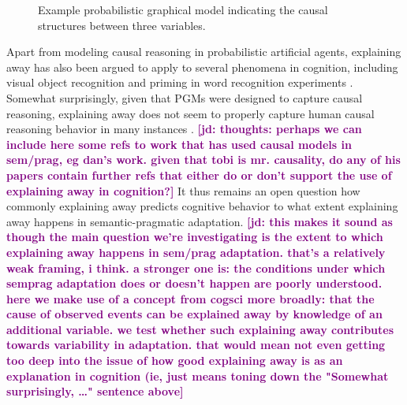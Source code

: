 \documentclass[man,floatsintext]{apa6}
\newcommand{\jd}[1]{\textcolor{Purple}{\bf [jd: #1]}}
\begin{document}
\begin{figure}[t]
    \centering
    \caption{Example probabilistic graphical model indicating the causal structures between three variables.}
    \label{fig:pgm-ex}
\end{figure}

Apart from modeling causal reasoning in probabilistic artificial agents, explaining away has also been argued to apply to several phenomena in cognition, including visual object recognition \cite{Murray2002} and priming in word recognition experiments \cite{Huber2008}. Somewhat surprisingly, given that PGMs were designed to capture causal reasoning, explaining away does not seem to properly capture human causal reasoning behavior in many instances \cite[inter alia]{Morris1995,Tenenbaum2002,Rehder2017}.  \jd{thoughts: perhaps we can include here some refs to work that has used causal models in sem/prag, eg dan's work. given that tobi is mr. causality, do any of his papers contain further refs that either do or don't support the use of explaining away in cognition?} It thus remains an open question how commonly explaining away predicts cognitive behavior to what extent explaining away happens in semantic-pragmatic adaptation. \jd{this makes it sound as though the main question we're investigating is the extent to which explaining away happens in sem/prag adaptation. that's a relatively weak framing, i think. a stronger one is: the conditions under which semprag adaptation does or doesn't happen are poorly understood. here we make use of a concept from cogsci more broadly: that the cause of observed events can be explained away by knowledge of an additional variable. we test whether such explaining away contributes towards variability in adaptation. that would mean not even getting too deep into the issue of how good explaining away is as an explanation in cognition (ie, just means toning down the "Somewhat surprisingly, \dots" sentence above}
\end{document}
